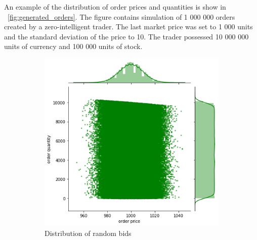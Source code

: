 
An example of the distribution of order prices and quantities
is show in ~\ref{fig:generated_orders}. The figure contains simulation %
of 1 000 000 orders created by a zero-intelligent trader. 
The last market price was set to 1 000 units and the standard deviation of the price to 10. 
The trader possessed 10 000 000 units of currency and 100 000 
units of stock.

\begin{figure}
    \centering
    \begin{subfigure}{.5\textwidth}
      \centering
      \includegraphics[width=\linewidth]{plots/order_distr_bid.png}
      \caption{Distribution of random bids}
      \label{fig:gener_bids}
    \end{subfigure}%
    \begin{subfigure}{.5\textwidth}
      \centering

\end{subfigure}
\end{figure}
